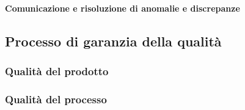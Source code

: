 			\paragraph{Comunicazione e risoluzione di anomalie e discrepanze}

	\subsection{Processo di garanzia della qualità}

		\subsubsection{Qualità del prodotto}

		\subsubsection{Qualità del processo}















